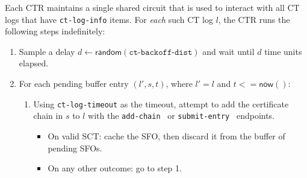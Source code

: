 Each CTR maintains a single shared circuit that is used to interact with all CT
logs that have \texttt{ct-log-info} items. For \emph{each} such CT log $l$, the
CTR runs the following steps indefinitely:
\begin{enumerate}
    \item\label{enm:auditing:backoff} Sample a delay $d \gets
        \mathsf{random}(\texttt{ct-backoff-dist})$ and wait until $d$ time units
        elapsed.
    \item\label{enm:auditing:loop} For each pending buffer entry $(l',s,t)$,
    where $l' = l$ and $t <= \mathsf{now}()$:
        \begin{enumerate}
            \item\label{enm:auditing:add-chain} Using \texttt{ct-log-timeout} as
                the timeout, attempt to add the certificate chain in $s$ to $l$
                with the \texttt{add-chain}~\cite{ct} or
                \texttt{submit-entry}~\cite{ct/bis} endpoints.
                \begin{itemize}
                    \item\label{enm:auditing:add-chain:success} On valid
                        SCT: cache the SFO, then discard it from the buffer of
                        pending SFOs.
                    \item\label{enm:auditing:add-chain:fail} On any other
                        outcome: go to step 1.
                \end{itemize}
        \end{enumerate}
\end{enumerate}
